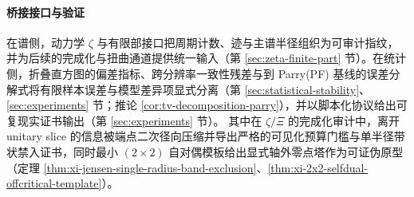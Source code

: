 \paragraph{桥接接口与验证}
在谱侧，动力学 \(\zeta\) 与有限部接口把周期计数、迹与主谱半径组织为可审计指纹，并为后续的完成化与扭曲通道提供统一输入（第 \ref{sec:zeta-finite-part} 节）。在统计侧，折叠直方图的偏差指标、跨分辨率一致性残差与到 Parry(PF) 基线的误差分解式将有限样本误差与模型差异项显式分离（第 \ref{sec:statistical-stability}、\ref{sec:experiments} 节；推论 \ref{cor:tv-decomposition-parry}），并以脚本化协议给出可复现实证书输出（第 \ref{sec:experiments} 节）。
其中在 \(\zeta/\Xi\) 的完成化审计中，离开 unitary slice 的信息被端点二次径向压缩并导出严格的可见化预算门槛与单半径带状禁入证书，同时最小 \((2\times2)\) 自对偶模板给出显式轴外零点塔作为可证伪原型（定理 \ref{thm:xi-jensen-single-radius-band-exclusion}、\ref{thm:xi-2x2-selfdual-offcritical-template}）。

